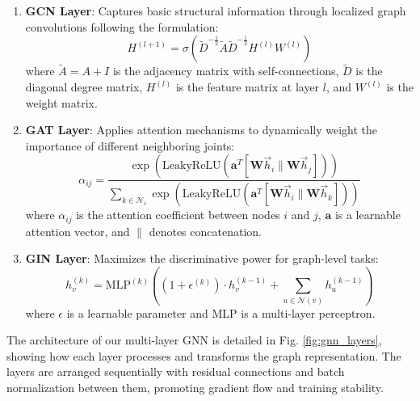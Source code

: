 \documentclass[conference]{IEEEtran}
\begin{document}
\begin{enumerate}
    \item \textbf{GCN Layer}: Captures basic structural information through localized graph convolutions following the formulation:
          \begin{equation}
              H^{(l+1)} = \sigma\left(\tilde{D}^{-\frac{1}{2}}\tilde{A}\tilde{D}^{-\frac{1}{2}}H^{(l)}W^{(l)}\right)
          \end{equation}
          where $\tilde{A} = A + I$ is the adjacency matrix with self-connections, $\tilde{D}$ is the diagonal degree matrix, $H^{(l)}$ is the feature matrix at layer $l$, and $W^{(l)}$ is the weight matrix.

    \item \textbf{GAT Layer}: Applies attention mechanisms to dynamically weight the importance of different neighboring joints:
          \begin{equation}
              \alpha_{ij} = \frac{\exp\left(\text{LeakyReLU}\left(\mathbf{a}^T[\mathbf{W}\vec{h}_i \| \mathbf{W}\vec{h}_j]\right)\right)}{\sum_{k \in \mathcal{N}_i} \exp\left(\text{LeakyReLU}\left(\mathbf{a}^T[\mathbf{W}\vec{h}_i \| \mathbf{W}\vec{h}_k]\right)\right)}
          \end{equation}
          where $\alpha_{ij}$ is the attention coefficient between nodes $i$ and $j$, $\mathbf{a}$ is a learnable attention vector, and $\|$ denotes concatenation.

    \item \textbf{GIN Layer}: Maximizes the discriminative power for graph-level tasks:
          \begin{equation}
              h_v^{(k)} = \text{MLP}^{(k)}\left((1+\epsilon^{(k)}) \cdot h_v^{(k-1)} + \sum_{u \in \mathcal{N}(v)} h_u^{(k-1)}\right)
          \end{equation}
          where $\epsilon$ is a learnable parameter and MLP is a multi-layer perceptron.
\end{enumerate}

The architecture of our multi-layer GNN is detailed in Fig.
\ref{fig:gnn_layers}, showing how each layer processes and transforms the graph
representation. The layers are arranged sequentially with residual connections
and batch normalization between them, promoting gradient flow and training
stability.
\end{document}
